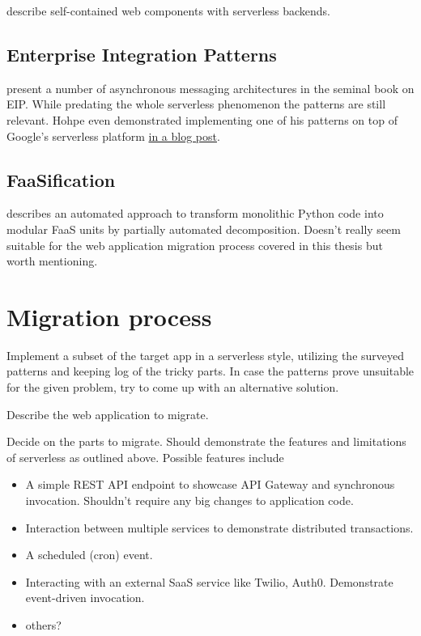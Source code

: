 \documentclass[utf8,english]{gradu3}
\begin{document}
\textcite{ast17webcomponent} describe self-contained web components with serverless backends.

\section{Enterprise Integration Patterns}

\textcite{hohpe2004enterprise} present a number of asynchronous messaging architectures in the seminal book on EIP. While predating the whole serverless phenomenon the patterns are still relevant. Hohpe even demonstrated implementing one of his patterns on top of Google's serverless platform \href{http://www.enterpriseintegrationpatterns.com/ramblings/google_cloud_functions.html}{in a blog post}.

\section{FaaSification}

\textcite{spillner17transformpython} describes an automated approach to transform monolithic Python code into modular FaaS units by partially automated decomposition. Doesn't really seem suitable for the web application migration process covered in this thesis but worth mentioning.

\chapter{Migration process}

Implement a subset of the target app in a serverless style, utilizing the surveyed patterns and keeping log of the tricky parts. In case the patterns prove unsuitable for the given problem, try to come up with an alternative solution.

Describe the web application to migrate.

Decide on the parts to migrate. Should demonstrate the features and limitations of serverless as outlined above. Possible features include
\begin{itemize}
  \item A simple REST API endpoint to showcase API Gateway and synchronous invocation. Shouldn't require any big changes to application code.
  \item Interaction between multiple services to demonstrate distributed transactions.
  \item A scheduled (cron) event.
  \item Interacting with an external SaaS service like Twilio, Auth0. Demonstrate event-driven invocation.
  \item others?
\end{itemize}
\end{document}
